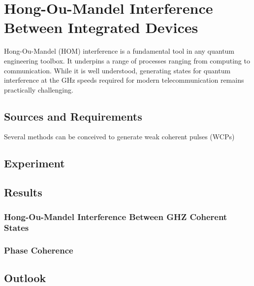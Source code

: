 %
%
\let\textcircled=\pgftextcircled
\chapter{Hong-Ou-Mandel Interference Between Integrated Devices}
\label{chap:hom}

Hong-Ou-Mandel (HOM) interference is a fundamental tool in any quantum engineering toolbox. It underpins a range of processes ranging from computing to communication. While it is well understood, generating states for quantum interference at the GHz speeds required for modern telecommunication remains practically challenging. 

\section{Sources and Requirements}
\label{sec:sources}

Several methods can be conceived to generate weak coherent pulses (WCPs)

\section{Experiment}

\section{Results}

\subsection{Hong-Ou-Mandel Interference Between GHZ Coherent States}

\subsection{Phase Coherence}

\section{Outlook}

